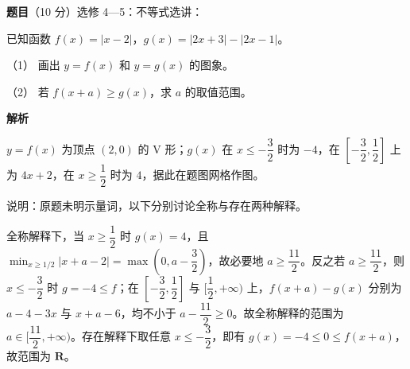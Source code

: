 \begin{answer}

\textbf{题目}（10 分）选修 4—5：不等式选讲：

已知函数 $f(x)=|x-2|$，$g(x)=|2x+3|-|2x-1|$。
\nopagebreak[4]
\begin{center}\end{center}
\nopagebreak[4]
（1） 画出 $y=f(x)$ 和 $y=g(x)$ 的图象。

（2） 若 $f(x+a)\geqslant g(x)$，求 $a$ 的取值范围。

\clearpage

\textbf{解析}


$y=f(x)$ 为顶点 $(2,0)$ 的 V 形；$g(x)$ 在 $x\leqslant-\dfrac32$ 时为 $-4$，在 $[-\dfrac32,\dfrac12]$ 上为 $4x+2$，在 $x\geqslant\dfrac12$ 时为 $4$，据此在题图网格作图。


说明：原题未明示量词，以下分别讨论全称与存在两种解释。

全称解释下，当 $x\geqslant\dfrac12$ 时 $g(x)=4$，且 $\min_{x\geqslant1/2}|x+a-2|=\max(0,a-\dfrac32)$，故必要地 $a\geqslant\dfrac{11}{2}$。反之若 $a\geqslant\dfrac{11}{2}$，则 $x\leqslant-\dfrac32$ 时 $g=-4\leqslant f$；在 $[-\dfrac32,\dfrac12]$ 与 $[\dfrac12,+\infty)$ 上，$f(x+a)-g(x)$ 分别为 $a-4-3x$ 与 $x+a-6$，均不小于 $a-\dfrac{11}{2}\geqslant0$。故全称解释的范围为 $a\in[\dfrac{11}{2},+\infty)$。存在解释下取任意 $x\leqslant-\dfrac32$，即有 $g(x)=-4\leqslant0\leqslant f(x+a)$，故范围为 $\mathbf R$。


\gkanswer{答案（2）：全称解释为 $a\in\left[\dfrac{11}{2},+\infty\right)$；存在解释为 $a\in\mathbf R$。}

\end{answer}